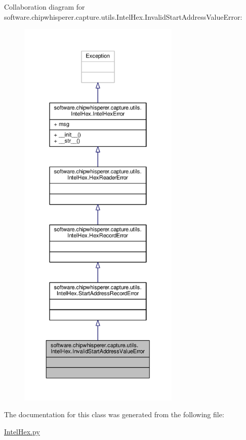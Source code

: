 Collaboration diagram for software.\+chipwhisperer.\+capture.\+utils.\+Intel\+Hex.\+Invalid\+Start\+Address\+Value\+Error\+:\nopagebreak
\begin{figure}[H]
\begin{center}
\leavevmode
\includegraphics[height=550pt]{db/d6d/classsoftware_1_1chipwhisperer_1_1capture_1_1utils_1_1IntelHex_1_1InvalidStartAddressValueError__coll__graph}
\end{center}
\end{figure}


The documentation for this class was generated from the following file\+:\begin{DoxyCompactItemize}
\item 
\hyperlink{IntelHex_8py}{Intel\+Hex.\+py}\end{DoxyCompactItemize}
